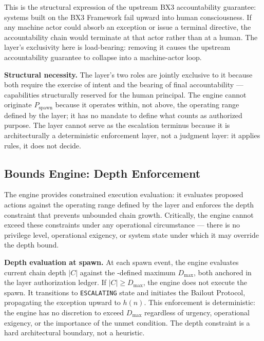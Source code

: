 This is the structural expression of the upstream BX3 accountability guarantee: systems built on the BX3 Framework fail upward into human consciousness. If any machine actor could absorb an exception or issue a terminal directive, the accountability chain would terminate at that actor rather than at a human. The \purpose{} layer's exclusivity here is load-bearing: removing it causes the upstream accountability guarantee to collapse into a machine-actor loop.

\medskip
\noindent\textbf{Structural necessity.} The \purpose{} layer's two roles are jointly exclusive to it because both require the exercise of intent and the bearing of final accountability --- capabilities structurally reserved for the human principal. The \bounds{} engine cannot originate $P_{\mathrm{spawn}}$ because it operates within, not above, the operating range defined by the \purpose{} layer; it has no mandate to define what counts as authorized purpose. The \fact{} layer cannot serve as the escalation terminus because it is architecturally a deterministic enforcement layer, not a judgment layer: it applies rules, it does not decide.

\subsection{Bounds Engine: Depth Enforcement}
\label{sec:bounds_depth}

The \bounds{} engine provides constrained execution evaluation: it evaluates proposed actions against the operating range defined by the \purpose{} layer and enforces the depth constraint that prevents unbounded chain growth. Critically, the \bounds{} engine cannot exceed these constraints under any operational circumstance --- there is no privilege level, operational exigency, or system state under which it may override the depth bound.

\medskip
\noindent\textbf{Depth evaluation at spawn.} At each spawn event, the \bounds{} engine evaluates current chain depth $|C|$ against the \purpose{}-defined maximum $D_{\mathrm{max}}$, both anchored in the \fact{} layer authorization ledger. If $|C| \geq D_{\mathrm{max}}$, the \bounds{} engine does not execute the spawn. It transitions to \texttt{ESCALATING} state and initiates the Bailout Protocol, propagating the exception upward to $h(n)$. This enforcement is deterministic: the \bounds{} engine has no discretion to exceed $D_{\mathrm{max}}$ regardless of urgency, operational exigency, or the importance of the unmet condition. The depth constraint is a hard architectural boundary, not a heuristic.

